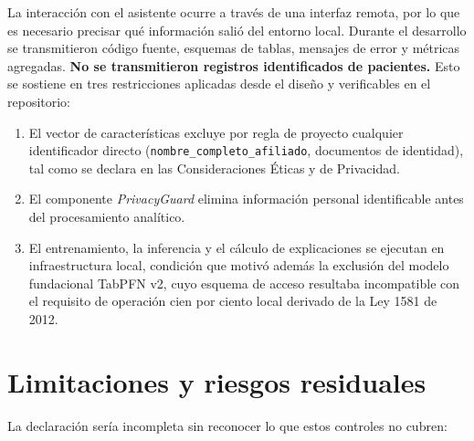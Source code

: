 \documentclass[12pt,letterpaper]{report}
\begin{document}
La interacción con el asistente ocurre a través de una interfaz remota, por lo que es
necesario precisar qué información salió del entorno local. Durante el desarrollo se
transmitieron código fuente, esquemas de tablas, mensajes de error y métricas agregadas.
\textbf{No se transmitieron registros identificados de pacientes.} Esto se sostiene en
tres restricciones aplicadas desde el diseño y verificables en el repositorio:

\begin{enumerate}
    \item El vector de características excluye por regla de proyecto cualquier
    identificador directo (\texttt{nombre\_completo\_afiliado}, documentos de identidad),
    tal como se declara en las Consideraciones Éticas y de Privacidad.
    \item El componente \textit{PrivacyGuard} elimina información personal identificable
    antes del procesamiento analítico.
    \item El entrenamiento, la inferencia y el cálculo de explicaciones se ejecutan en
    infraestructura local, condición que motivó además la exclusión del modelo
    fundacional TabPFN v2, cuyo esquema de acceso resultaba incompatible con el
    requisito de operación cien por ciento local derivado de la Ley 1581 de 2012.
\end{enumerate}

\section{Limitaciones y riesgos residuales}

La declaración sería incompleta sin reconocer lo que estos controles no cubren:
\end{document}
